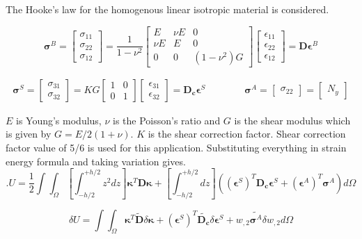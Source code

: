 \documentclass[9pt]{beamer}
\newcommand{\vect}[1]{\boldsymbol{#1}}
\begin{document}
\begin{frame}

The Hooke's law for the  homogenous linear isotropic material is considered.

\begin{equation}
\vect{\sigma}^B = \begin{bmatrix}
\sigma_{11}
\\
\sigma_{22}
\\
 \sigma_{12}
\end{bmatrix}
=\dfrac{1}{1-\nu^2}
\begin{bmatrix}
E & \nu E & 0
\\
\nu E & E & 0
\\
0 & 0 & (1-\nu^2)G
\end{bmatrix}
\begin{bmatrix}
\epsilon_{11}
\\
\epsilon_{22}
\\
 \epsilon_{12}
\end{bmatrix}
=
\vect{D}
\vect{ \epsilon}^B
\end{equation}


\begin{align*}
\vect{\sigma}^S = \begin{bmatrix}
\sigma_{31}
\\
 \sigma_{32}
\end{bmatrix}
=KG
\begin{bmatrix}
1 & 0 
\\
0 & 1 
\end{bmatrix}
\begin{bmatrix}
\epsilon_{31}
\\
\epsilon_{32}
\end{bmatrix}
=
\vect{D_c} \vect{\epsilon}^S
\qquad
\qquad
\vect{\sigma}^A = \begin{bmatrix}
\sigma_{22}
\end{bmatrix}
=
\begin{bmatrix}
N_y
\end{bmatrix}
\end{align*}



$E$ is Young's modulus, $\nu$ is the Poisson's ratio and $G$ is the shear modulus which is given by $G=E / 2 ( 1+\nu ) $. $K$ is the shear correction factor. Shear correction factor value of 5/6 is used for this application. Substituting everything in strain energy formula and taking variation gives. 
\begin{equation*}. 
U=\frac{1}{2} \int\int_\Omega \left[ \int_{-h/2}^{+h/2} z^2 dz\right] \vect{\kappa}^T {\vect{D}} \vect{\kappa} 
+ \left[ \int_{-h/2}^{+h/2} dz\right]
(
\left(\vect{\epsilon}^S
\right)^T {\vect{D_c}} \vect{\epsilon}^S 
+ 
 \left(\vect{\epsilon}^A\right)^T \vect{\sigma}^A 
 ) d \Omega
\end{equation*}


\begin{equation*}
\delta U=\int\int_\Omega 
\vect{\kappa}^T \vect{\tilde{D}} \delta\vect{\kappa} 
+ 
\left(\vect{\epsilon}^S\right)^T \vect{\tilde{D_c}} \delta \vect{\epsilon}^S 
+ 
w_{,2}\tilde{\vect{\sigma}^A} \delta w_{,2} d \Omega
\end{equation*}

\end{frame}
\end{document}
